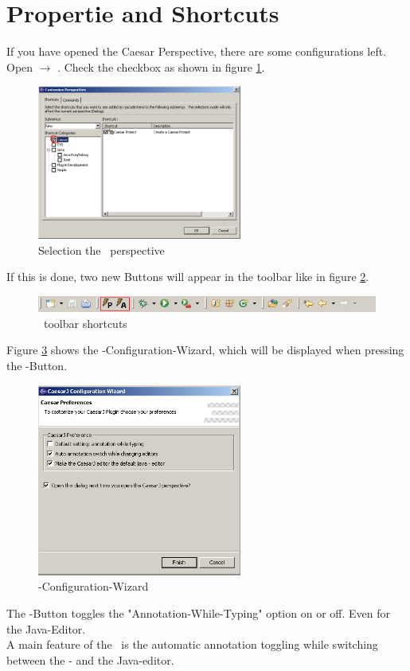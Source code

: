 \section{Propertie and Shortcuts}
If you have opened the Caesar Perspective, there are some configurations left. Open  $\rightarrow$ . Check the  checkbox as shown in figure \ref{fig:propert}.

\begin{figure}[htbp]
	\centering
		\includegraphics[width=0.60\textwidth]{images/propert.png}
	\caption{Selection the \caesarj ~perspective}
	\label{fig:propert}
\end{figure}

If this is done, two new Buttons will appear in the toolbar like in figure \ref{fig:toolbar}.

\begin{figure}[htbp]
	\centering
		\includegraphics[width=1.0\textwidth]{images/toolbar.png}
	\caption{\caesarj ~toolbar shortcuts}
	\label{fig:toolbar}
\end{figure}

Figure \ref{fig:properties} shows the \caesarj -Configuration-Wizard, which will be displayed when pressing the -Button.

\begin{figure}[htbp]
	\centering
		\includegraphics[width=0.60\textwidth]{images/view_properties.png}
	\caption{\caesarj -Configuration-Wizard}
	\label{fig:properties}
\end{figure}

The -Button toggles the "Annotation-While-Typing" option on or off. Even for the Java-Editor.\\
A main feature of the \cjdt ~is the automatic annotation toggling while switching between the \caesarj - and the Java-editor.


